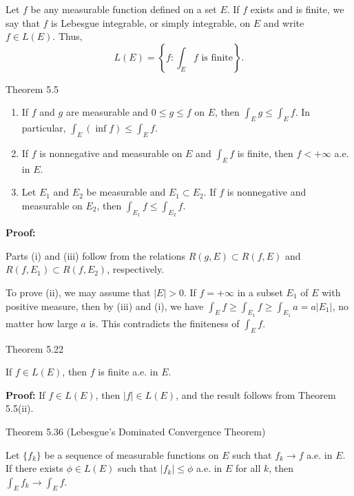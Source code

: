 \documentclass[UTF8,a4paper,10pt]{article}
\begin{document}
\begin{mybox}{}

  Let \(f\) be any measurable function defined on a set \(E\). If $f$ exists and is finite, we say that $f$ is Lebesgue integrable, or simply integrable, on $E$ and write $f \in L(E)$. Thus,
\[
L(E) = \left\{ f : \int_{E} f \text{ is finite} \right\}.
\]
\end{mybox}

\begin{mybox}{Theorem 5.5}

\begin{enumerate}[label=(\roman*)]
    \item If $f$ and $g$ are measurable and $0 \leq g \leq f$ on $E$, then $\int_E g \leq \int_E f $. In particular, $\int_E (\inf f) \leq \int_E f$.
    \item If $f$ is nonnegative and measurable on $E$ and $\int_E f$ is finite, then $f < +\infty$ a.e. in $E$.
    \item Let $E_1$ and $E_2$ be measurable and $E_1 \subset E_2$. If $f$ is nonnegative and measurable on $E_2$, then $\int_{E_1} f \leq \int_{E_2} f$.
\end{enumerate}

\textbf{Proof:} 

Parts (i) and (iii) follow from the relations $R(g, E) \subset R(f, E)$ and $R(f, E_1) \subset R(f, E_2)$, respectively. 

To prove (ii), we may assume that $|E| > 0$. If $f = +\infty$ in a subset $E_1$ of $E$ with positive measure, then by (iii) and (i), we have $\int_E f \geq \int_{E_1} f \geq \int_{E_1} a = a|E_1|$, no matter how large $a$ is. This contradicts the finiteness of $\int_E f$.
\end{mybox}


\begin{mybox}{Theorem 5.22}

  If $f \in L(E)$, then $f$ is finite a.e. in $E$.

\textbf{Proof:} If $f \in L(E)$, then $|f| \in L(E)$, and the result follows from Theorem 5.5(ii).

\end{mybox}


\begin{mybox}{Theorem 5.36 (Lebesgue's Dominated Convergence Theorem)}

  Let $\{f_k\}$ be a sequence of measurable functions on $E$ such that $f_k \to f$ a.e. in $E$. If there exists $\phi \in L(E)$ such that $|f_k| \leq \phi$ a.e. in $E$ for all $k$, then $\int_E f_k  \to \int_E f $.

\end{mybox}
\end{document}
